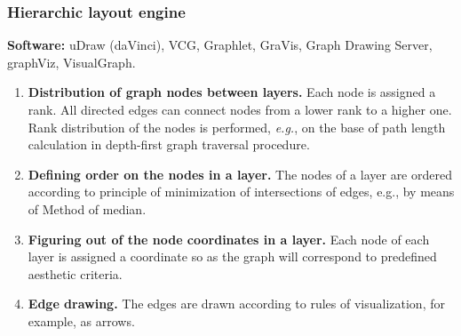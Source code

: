 \documentclass[aspectratio=169]{beamer}
\begin{document}
\begin{frame}
\frametitle{Hierarchic layout engine}
\textbf{Software:} uDraw (daVinci), VCG, Graphlet, GraVis, Graph Drawing Server, graphViz, VisualGraph.
\begin{enumerate}
\item \textbf{Distribution of graph nodes between layers.} Each node is assigned a rank.  All directed edges can connect nodes from a lower rank to a higher one.  Rank distribution of the nodes is performed, \emph{e.g.}, on the base of path length calculation in depth-first graph traversal procedure.
\item \textbf{Defining order on the nodes in a layer.} The nodes of a layer are ordered according to principle of minimization of intersections of edges, e.g., by means of Method of median.
\item \textbf{Figuring out of the node coordinates in a layer.} Each node of each layer is assigned a coordinate so as the graph will correspond to predefined aesthetic criteria.
\item \textbf{Edge drawing.} The edges are drawn according to rules of visualization, for example, as arrows.
\end{enumerate}
\end{frame}

\end{document}
